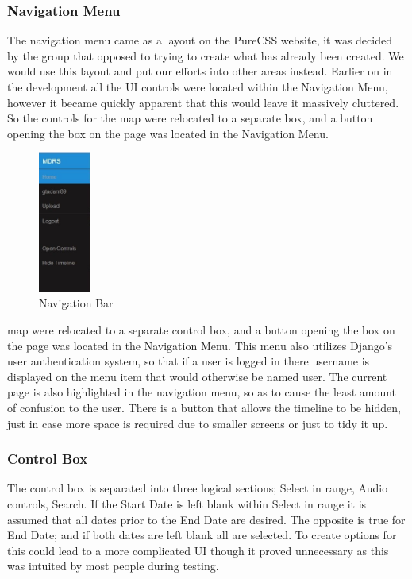 \documentclass{l3proj}
\begin{document}
\subsubsection{Navigation Menu}

The navigation menu came as a layout on the PureCSS website, it was decided by the group that opposed to trying to create what has already been created. We would use this layout and put our efforts into other areas instead. Earlier on in the development all the UI controls were located within the Navigation Menu, however it became quickly apparent that this would leave it massively cluttered. So the controls for the map were relocated to a separate box, and a button opening the box on the page was located in the Navigation Menu.

\begin{figure}[ht!]
\centering
\includegraphics[width=0.15\textwidth]{images/nav-bar.jpg}
\caption{Navigation Bar}
\end{figure}

map were relocated to a separate control box, and a button opening the box on the page was located in the Navigation Menu. This menu also utilizes Django's user authentication system, so that if a user is logged in there username is displayed on the menu item that would otherwise be named user. The current page is also highlighted in the navigation menu, so as to cause the least amount of confusion to the user. There is a button that allows the timeline to be hidden, just in case more space is required due to smaller screens or just to tidy it up.

\subsubsection{Control Box}

The control box is separated into three logical sections; Select in range, Audio controls, Search. If the Start Date is left blank within Select in range it is assumed that all dates prior to the End Date are desired. The opposite is true for End Date; and if both dates are left blank all are selected. To create options for this could lead to a more complicated UI though it proved unnecessary as this was intuited by most people during testing.
\end{document}
